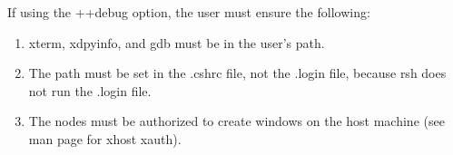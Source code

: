 If using the {\fexec ++debug} option, the user must ensure the
following:
\begin{enumerate}

\item {\fexec xterm}, {\fexec xdpyinfo},  and {\fexec gdb} must be in
the user's path.

\item The path must be set in the {\fexec .cshrc} file, not the {\fexec .login}
file, because {\fexec rsh} does not run the {\fexec .login} file. 

\item The nodes must be authorized to create windows on the host machine (see
man page for {\fexec xhost} {\fexec xauth}).

\end{enumerate}

